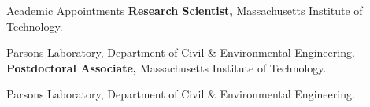 \begin{rubric}{Academic Appointments}
%
	\textbf{Research Scientist,} Massachusetts Institute of Technology.
    \par Parsons Laboratory, Department of Civil \& Environmental Engineering.
%
%
\entry*[2016 -- 2021]%
	\textbf{Postdoctoral Associate,} Massachusetts Institute of Technology.
    \par Parsons Laboratory, Department of Civil \& Environmental Engineering.
%
\end{rubric}